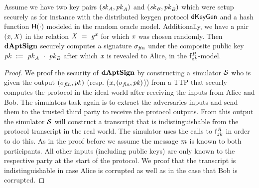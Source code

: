 \begin{theorem} \label{lem:sig:daptsign}
    Assume we have two key pairs $(\mathit{sk}_{\mathit{A}}, \mathit{pk}_{\mathit{A}})$ and $(\mathit{sk}_{\mathit{B}}, \mathit{pk}_{\mathit{B}})$ which were setup securely as for instance with the distributed keygen protocol $\mathsf{dKeyGen}$ and a hash function $\mathsf{H} (\cdot)$ modeled in the random oracle model.
    Additionally, we have a pair $(\mathit{x}, \mathit{X})$ in the relation $\mathit{X} ~=~ \mathit{g}^{\mathit{x}}$ for which $\mathit{x}$ was chosen randomly.
    Then $\mathbf{dAptSign}$ securely computes a signature $\sigma_{\mathit{fin}}$ under the composite public key $\mathit{pk} ~:=~ \mathit{pk}_{\mathit{A}} ~\cdot~ \mathit{pk}_{\mathit{B}}$ after which $\mathit{x}$ is revealed to Alice, in the $\mathsf{f}^{\mathit{R}}_{zk}$-model.
\end{theorem}

\begin{proof}
    We proof the security of $\mathbf{dAptSign}$ by constructing a simulator $\mathcal{S}$ who is given the output $(\sigma_{\mathit{fin}}, \mathit{pk})$ (resp. ($\mathit{x}, (\sigma_{\mathit{fin}}, \mathit{pk})$)) from a TTP that securly computes the protocol in the ideal world after receiving the inputs from Alice and Bob.
    The simulators task again is to extract the adversaries inputs and send them to the trusted third party to receive the protocol outputs.
    From this output the simulator $\mathcal{S}$ will construct a transcript that is indistinguishable from the protocol transcript in the real world.
    The simulator uses the calls to $\mathsf{f}^{\mathit{R}}_{zk}$ in order to do this.
    As in the proof before we assume the message $\mathit{m}$ is known to both participants.
    All other inputs (including public keys) are only known to the respective party at the start of the protocol.
    We proof that the transcript is indistinguishable in case Alice is corrupted as well as in the case that Bob is corrupted.


\end{proof}
